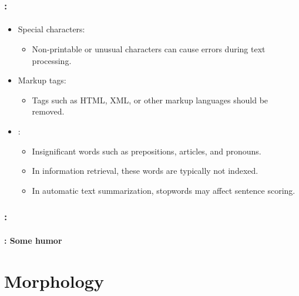 \documentclass[xcolor=table]{beamer}
\begin{document}
\begin{frame}
	\frametitle{\insertshortsubtitle: \insertsection}
	\framesubtitle{\insertsubsection}
	
	\begin{itemize}
		\item Special characters:
		\begin{itemize}
			\item Non-printable or unusual characters can cause errors during text processing.
		\end{itemize}
		
		\item Markup tags:
		\begin{itemize}
			\item Tags such as HTML, XML, or other markup languages should be removed.
		\end{itemize}
		
		\item {}:
		\begin{itemize}
			\item Insignificant words such as prepositions, articles, and pronouns.
			\item In information retrieval, these words are typically not indexed.
			\item In automatic text summarization, stopwords may affect sentence scoring.
		\end{itemize}
	\end{itemize}

\end{frame}

\begin{frame}
	\frametitle{\insertshortsubtitle: \insertsection}
	\framesubtitle{\insertsubsection: Some humor}

	\begin{center}
	\end{center}

\end{frame}

\section{Morphology}
\end{document}

